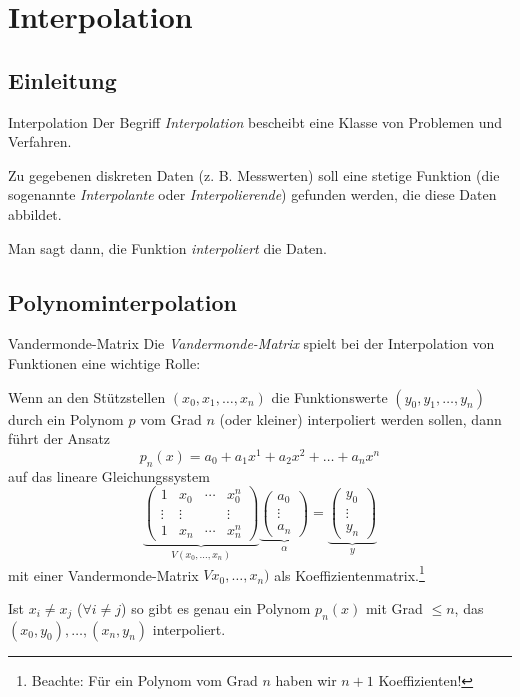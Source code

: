 \section{Interpolation}

\subsection{Einleitung}

\begin{defi}{Interpolation}
    Der Begriff \emph{Interpolation} bescheibt eine Klasse von Problemen und Verfahren. 
    
    Zu gegebenen diskreten Daten (z. B. Messwerten) soll eine stetige Funktion (die sogenannte \emph{Interpolante} oder \emph{Interpolierende}) gefunden werden, die diese Daten abbildet. 
    
    Man sagt dann, die Funktion \emph{interpoliert} die Daten. 
\end{defi}

\subsection{Polynominterpolation}

\begin{defi}{Vandermonde-Matrix}
    Die \emph{Vandermonde-Matrix} spielt bei der Interpolation von Funktionen eine wichtige Rolle: 
    
    Wenn an den Stützstellen $(x_0, x_1, \ldots, x_n)$ die Funktionswerte $(y_0, y_1, \ldots, y_n)$ durch ein Polynom $p$ vom Grad $n$ (oder kleiner) interpoliert werden sollen, dann führt der Ansatz 
    \[
        p_n(x) = a_0 + a_1 x^1 + a_2 x^2 + \ldots + a_{n} x^{n}
    \]
    auf das lineare Gleichungssystem 
    \[
        \underbrace{\begin{pmatrix}
            1 & x_0 & \cdots & x_0^n \\ 
            \vdots & \vdots & & \vdots \\ 
            1 & x_n & \cdots & x_n^n 
        \end{pmatrix}}_{V(x_0, \ldots, x_n)}
        \underbrace{\begin{pmatrix}
            a_0 \\ \vdots \\ a_n
        \end{pmatrix}}_{\alpha}
        =
        \underbrace{\begin{pmatrix}
            y_0 \\ \vdots \\ y_n     
        \end{pmatrix}}_{y}
    \]
    mit einer Vandermonde-Matrix $Vx_0, \ldots, x_n)$ als Koeffizientenmatrix.\footnote{Beachte: Für ein Polynom vom Grad $n$ haben wir $n+1$ Koeffizienten!}

    Ist $x_i \neq x_j$ ($\forall i \neq j$) so gibt es genau ein Polynom $p_n(x)$ mit Grad $\leq n$, das $(x_0, y_0), \ldots, (x_n, y_n)$ interpoliert. 
\end{defi}

